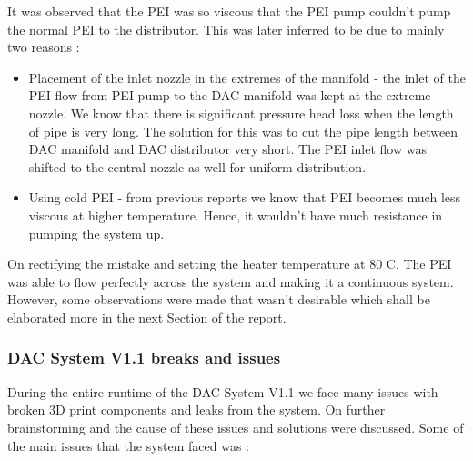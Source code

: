 It was observed that the PEI was so viscous that the PEI pump couldn't pump the normal PEI to the distributor. This was later inferred to be due to mainly two reasons :
\begin{itemize}
    \item Placement of the inlet nozzle in the extremes of the manifold - the inlet of the PEI flow from PEI pump to the DAC manifold was kept at the extreme nozzle. We know that there is significant pressure head loss when the length of pipe is very long. The solution for this was to cut the pipe length between DAC manifold and DAC distributor very short. The PEI inlet flow was shifted to the central nozzle as well for uniform distribution. 
    \item Using cold PEI - from previous reports we know that PEI becomes much less viscous at higher temperature. Hence, it wouldn't have much resistance in pumping the system up. 
\end{itemize} 


On rectifying the mistake and setting the heater temperature at 80 \degree C. The PEI was able to flow perfectly across the system and making it a continuous system. However, some observations were made that wasn't desirable which shall be elaborated more in the next Section of the report. 

\subsubsection{DAC System V1.1 breaks and issues}
\label{sec:breakdown}

During the entire runtime of the DAC System V1.1 we face many issues with broken 3D print components and leaks from the system. On further brainstorming and the cause of these issues and solutions were discussed. Some of the main issues that the system faced was : 

